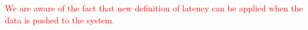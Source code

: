 \textcolor{red}{ We are aware of the fact that new definition of latency can be applied when the data is pushed to the system. }






